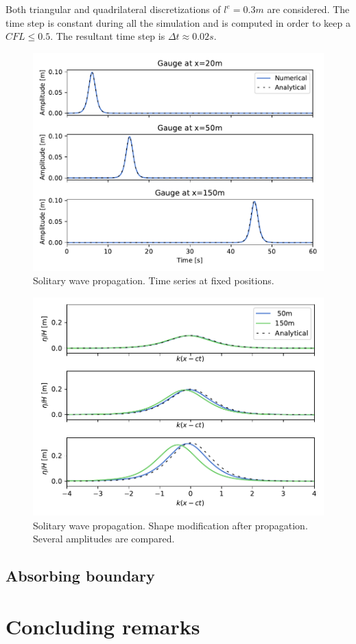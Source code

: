 Both triangular and quadrilateral discretizations of $l^e=0.3m$ are considered. The time step is constant during all the simulation and is computed in order to keep a $CFL\leq0.5$. The resultant time step is $\Delta t\approx0.02s$.

\begin{figure}[ht]
    \centering
    \includegraphics[width=.8\textwidth]{img/boussinesq/gauges.pdf}
    \caption{Solitary wave propagation. Time series at fixed positions.}
    \label{bsq_solitary_wave_gauges}
\end{figure}

\begin{figure}[ht]
    \centering
    \includegraphics[width=.8\textwidth]{img/boussinesq/shapes.pdf}
    \caption{Solitary wave propagation. Shape modification after propagation. Several amplitudes are compared.}
    \label{bsq_solitary_wave_shapes}
\end{figure}

\subsection{Absorbing boundary}




\section{Concluding remarks}


